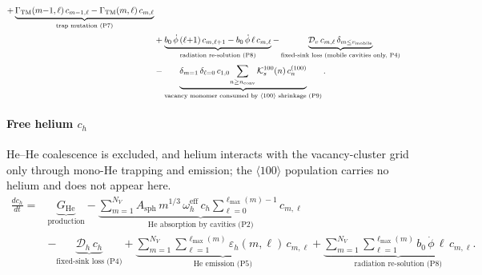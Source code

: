 \begin{equation}
\begin{split}
  + \underbrace{
     \Gamma_{\mathrm{TM}}(m{-}1,\ell)\,c_{m-1,\ell}
   - \Gamma_{\mathrm{TM}}(m,\ell)\,c_{m,\ell}
     }_{\text{trap mutation (P7)}}
  \\[2pt]
  &+ \underbrace{
     b_0\,\dot{\phi}\,(\ell{+}1)\,c_{m,\ell+1}
   - b_0\,\dot{\phi}\,\ell\,c_{m,\ell}
     }_{\text{radiation re-solution (P8)}}
  - \underbrace{
     \mathcal{D}_v\,c_{m,\ell}\,\delta_{m \leq v_{\rm mobile}}
     }_{\text{fixed-sink loss (mobile cavities only, P4)}}
  \\[2pt]
  &- \underbrace{
     \delta_{m=1}\,\delta_{\ell=0}\,c_{1,0}\!
     \sum_{n\geq n_{\rm conv}} \mathcal{K}^{100}_{s}(n)\,c^{(100)}_n
     }_{\text{vacancy monomer consumed by }\langle100\rangle\text{ shrinkage (P9)}}.
\end{split}
\end{equation}

\paragraph{Free helium $c_h$}
\label{sec:ME_He}
He--He coalescence is excluded, and helium interacts with the vacancy-cluster
grid only through mono-He trapping and emission; the $\langle100\rangle$
population carries no helium and does not appear here.
\begin{equation}\label{eq:ME_He}
\begin{split}
\frac{dc_h}{dt} = {} &
  \underbrace{G_{\mathrm{He}}}_{\text{production}}
  - \underbrace{
     \sum_{m=1}^{N_V}
     A_{\mathrm{sph}}\,m^{1/3}\,\omega_h^{\mathrm{eff}}\,c_h
     \sum_{\ell=0}^{\ell_{\max}(m)-1} c_{m,\ell}
     }_{\text{He absorption by cavities (P2)}}
  \\[2pt]
  &- \underbrace{
     \mathcal{D}_h\,c_h
     }_{\text{fixed-sink loss (P4)}}
  + \underbrace{
     \sum_{m=1}^{N_V}\sum_{\ell=1}^{\ell_{\max}(m)}
     \varepsilon_h(m,\ell)\,c_{m,\ell}
     }_{\text{He emission (P5)}}
  + \underbrace{
     \sum_{m=1}^{N_V}\sum_{\ell=1}^{\ell_{\max}(m)}
     b_0\,\dot{\phi}\,\ell\,c_{m,\ell}
     }_{\text{radiation re-solution (P8)}}.
\end{split}
\end{equation}

